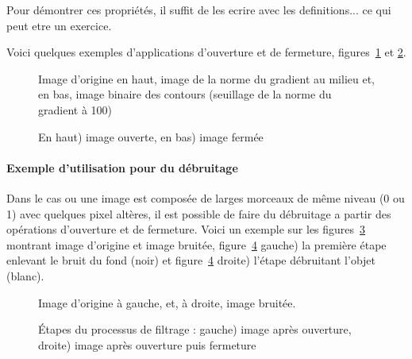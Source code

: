 \documentclass[10pt,a4paper]{article}
\begin{document}
Pour d\'{e}montrer ces propri\'{e}t\'{e}s, il suffit de les ecrire avec les definitions... ce qui peut etre un exercice.

Voici quelques exemples d'applications d'ouverture et de fermeture, figures~\ref{piece} et \ref{pieceOF}.


\begin{figure}[h]
\hspace{-0.2\textwidth}
	\caption{Image d'origine en haut, image de la norme du gradient au milieu et, en bas, image binaire des contours (seuillage de la norme du gradient \`{a} 100)}
	\label{piece}
\end{figure}

\begin{figure}[h]
\hspace{-0.2\textwidth}
\caption{En haut) image ouverte, en bas) image ferm\'{e}e}
\label{pieceOF}
\end{figure}


\clearpage

\paragraph{Exemple d'utilisation pour du d\'{e}bruitage} Dans le cas ou une image est compos\'{e}e de larges morceaux de m\^{e}me niveau (0 ou 1) avec quelques pixel alt\`{e}res, il est possible de faire du d\'{e}bruitage a partir des op\'{e}rations d'ouverture et de fermeture. Voici un exemple sur les figures~\ref{debruitageOrigine} montrant image d'origine et image bruit\'{e}e, figure~\ref{debruitageSteps} gauche)  la premi\`{e}re \'{e}tape enlevant le bruit du fond (noir) et figure~\ref{debruitageSteps} droite) l'\'{e}tape d\'{e}bruitant l'objet (blanc).

\begin{figure}[h]
\hspace{-0.2\textwidth}
\vspace{-40mm}
	\caption{Image d'origine \`{a} gauche, et, \`{a} droite, image bruit\'{e}e.}
	\label{debruitageOrigine}
\end{figure}

\begin{figure}[h]
\hspace{-0.2\textwidth}
\vspace{-40mm}
	\caption{\'{E}tapes du processus de filtrage : gauche) image apr\`{e}s ouverture, droite) image apr\`{e}s ouverture puis fermeture}
	\label{debruitageSteps}
\end{figure}
\end{document}

